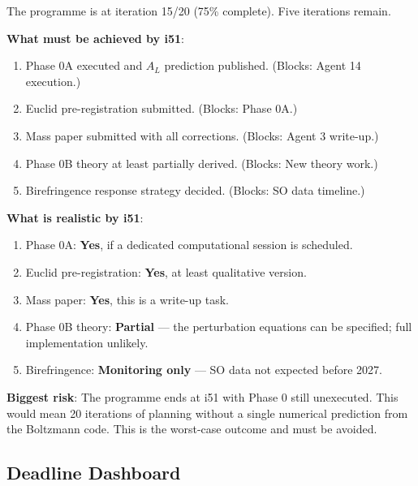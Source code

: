 \documentclass[11pt,a4paper]{article}
\begin{document}
\begin{tcolorbox}[colback=yellow!5!white, colframe=yellow!60!black,
  title={Programme Trajectory: i46--i51 (Final 5 Iterations)}]

The programme is at iteration 15/20 (75\% complete). Five iterations remain.

\textbf{What must be achieved by i51}:
\begin{enumerate}
\item Phase 0A executed and $A_L$ prediction published. (Blocks: Agent 14 execution.)
\item Euclid pre-registration submitted. (Blocks: Phase 0A.)
\item Mass paper submitted with all corrections. (Blocks: Agent 3 write-up.)
\item Phase 0B theory at least partially derived. (Blocks: New theory work.)
\item Birefringence response strategy decided. (Blocks: SO data timeline.)
\end{enumerate}

\textbf{What is realistic by i51}:
\begin{enumerate}
\item Phase 0A: \textbf{Yes}, if a dedicated computational session is scheduled.
\item Euclid pre-registration: \textbf{Yes}, at least qualitative version.
\item Mass paper: \textbf{Yes}, this is a write-up task.
\item Phase 0B theory: \textbf{Partial} --- the perturbation equations can be specified; full implementation unlikely.
\item Birefringence: \textbf{Monitoring only} --- SO data not expected before 2027.
\end{enumerate}

\textbf{Biggest risk}: The programme ends at i51 with Phase 0 still unexecuted. This would mean 20 iterations of planning without a single numerical prediction from the Boltzmann code. This is the worst-case outcome and must be avoided.
\end{tcolorbox}

\subsection{Deadline Dashboard}
\end{document}
